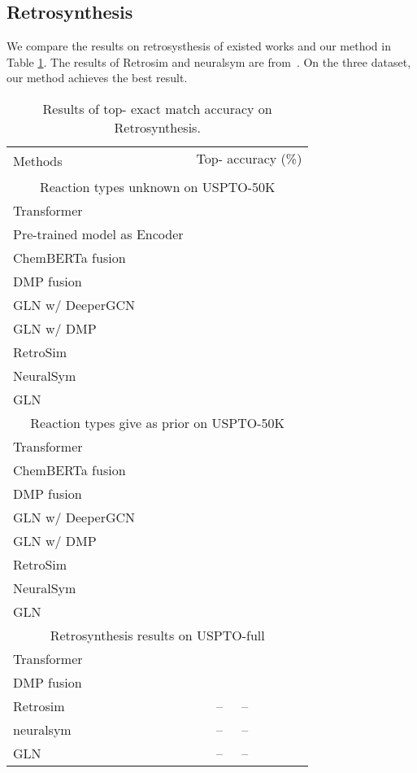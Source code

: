 \documentclass{article}
\newcommand{\ourM}{DMP}
\begin{document}
\subsection{Retrosynthesis}\label{appendix:retrosys}
We compare the results on retrosysthesis of existed works and our method in Table \ref{appendix:retrosys_more}. The results of Retrosim and neuralsym are from~\cite{GLN}.
On the three dataset, our method achieves the best result. 
\begin{table}[!htb]
\small
    \centering
    \begin{tabular}{lcccccc}
    \toprule
         \multirow{2}{*}{Methods} & \multicolumn{6}{c}{Top- accuracy (\%)}  \\
         \cmidrule{2-7}
         & &  & & & & \\
         \midrule
         \multicolumn{7}{c}{Reaction types unknown on USPTO-50K}\\
         \midrule
         Transformer &  &  &  &  &  &  \\
         Pre-trained model as Encoder& &&&&&\\
          ChemBERTa fusion \cite{chithrananda2020chemberta}&&&&&&\\
         \ourM{} fusion &&&&&& \\
          GLN w/ DeeperGCN &  & &&&&\\
         GLN w/ \ourM{}  &&&&&&\\
         \midrule
         RetroSim &  && &&& \\
         NeuralSym & &&&&& \\
         GLN~\cite{GLN}&&&&&&\\
         \midrule
         \multicolumn{7}{c}{Reaction types give as prior on USPTO-50K}\\
         \midrule
         Transformer &  &  & && & \\
          ChemBERTa fusion \cite{chithrananda2020chemberta}&&&&&&\\
          \ourM{} fusion  &&&&&&\\
GLN w/ DeeperGCN &  & &&&&\\
GLN w/ \ourM{}  &&&&&&\\
         \midrule
         RetroSim &  && &&& \\
         NeuralSym & &&&&& \\
         GLN~\cite{GLN}&&&&&&\\
         \midrule
         \multicolumn{7}{c}{Retrosynthesis results on USPTO-full}\\
         \midrule
         Transformer &  &  &  &  &&  \\
\ourM{} fusion &&&&&& \\
         \midrule
         Retrosim &  & -- & -- &  \\
         neuralsym &  & -- & -- &  \\
         GLN~\cite{GLN} &  & -- & -- & \\
         \bottomrule
    \end{tabular}
    \caption{Results of top- exact match accuracy on Retrosynthesis. }
    \label{appendix:retrosys_more}
\end{table}
\end{document}
